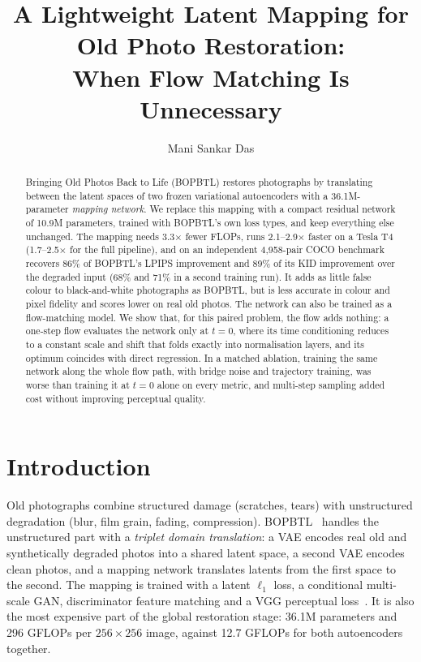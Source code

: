 \documentclass[10pt,twocolumn,letterpaper]{article}
\title{A Lightweight Latent Mapping for Old Photo Restoration:\\When Flow Matching Is Unnecessary}
\author{Mani Sankar Das}
\date{}
\begin{document}
\maketitle

\begin{abstract}
Bringing Old Photos Back to Life (BOPBTL) restores photographs by translating between the latent spaces of two frozen
variational autoencoders with a 36.1M-parameter \emph{mapping network}. We replace this mapping with a compact residual
network of 10.9M parameters, trained with BOPBTL's own loss types, and keep everything else unchanged. The mapping needs
3.3$\times$ fewer FLOPs, runs 2.1--2.9$\times$ faster on a Tesla T4 (1.7--2.5$\times$ for the full pipeline), and on an
independent 4{,}958-pair COCO benchmark recovers 86\% of BOPBTL's LPIPS improvement and 89\% of its KID improvement over
the degraded input (68\% and 71\% in a second training run). It adds as little false colour to black-and-white
photographs as BOPBTL, but is less accurate in colour and pixel fidelity and scores lower on real old photos. The
network can also be trained as a flow-matching model. We show that, for this paired problem, the flow adds nothing: a one-step flow
evaluates the network only at $t{=}0$, where its time conditioning reduces to a constant scale and shift that folds
exactly into normalisation layers, and its optimum coincides with direct regression. In a matched ablation, training
the same network along the whole flow path, with bridge noise and trajectory training, was worse than training it at
$t{=}0$ alone on every metric, and multi-step sampling added cost without improving perceptual quality.
\end{abstract}

\section{Introduction}
\label{sec:intro}

Old photographs combine structured damage (scratches, tears) with unstructured degradation (blur, film grain, fading,
compression). BOPBTL~\cite{wan2020bringing,wan2022old} handles the unstructured part with a \emph{triplet domain
translation}: a VAE encodes real old and synthetically degraded photos into a shared latent space, a second VAE encodes
clean photos, and a mapping network translates latents from the first space to the second. The mapping is trained with
a latent $\ell_1$ loss, a conditional multi-scale GAN, discriminator feature matching and a VGG perceptual
loss~\cite{wang2018pix2pixhd}. It is also the most expensive part of the global restoration stage: 36.1M parameters and
296 GFLOPs per $256{\times}256$ image, against 12.7 GFLOPs for both autoencoders together.
\end{document}
